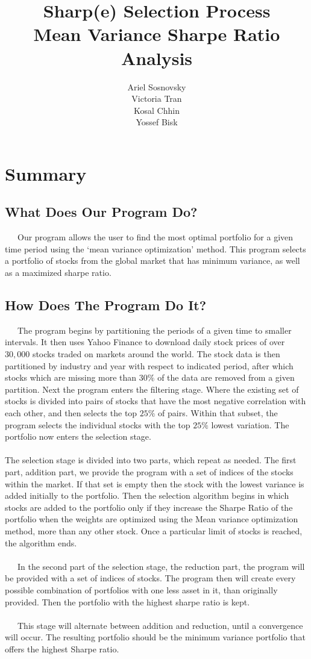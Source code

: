 \documentclass[12pt,titlepage,a4paper]{article}
\title{Sharp(e) Selection Process \\
	\large Mean Variance Sharpe Ratio Analysis}
\author{
	Ariel Sosnovsky\\
	Victoria Tran\\
	Kosal Chhin\\
	Yossef Bisk}
\begin{document}
\maketitle
\section{Summary}
\subsection{What Does Our Program Do?}
\ \ \ Our program allows the user to find the most optimal portfolio for a given time period using the ‘mean variance optimization’ method. This program selects a portfolio of stocks from the global market that has minimum variance, as well as a maximized sharpe ratio.

\subsection{How Does The Program Do It?}
\ \ \ The program begins by partitioning the periods of a given time to smaller intervals. It then uses Yahoo Finance to download daily stock prices of over $30,000$ stocks traded on markets around the world. The stock data is then partitioned by industry and year with respect to indicated period, after which stocks which are missing more than $30\%$ of the data are removed from a given partition. Next the program enters the filtering stage. Where the existing set of stocks is divided into pairs of stocks that have the most negative correlation with each other, and then selects the top $25\%$ of pairs. Within that subset, the program selects the individual stocks with the top $25\%$ lowest variation. The portfolio now enters the selection stage. \\ \\
The selection stage is divided into two parts, which repeat as needed. The first part, addition part, we provide the program with a set of indices of the stocks within the market. If that set is empty then the stock with the lowest variance is added initially to the portfolio. Then the selection algorithm begins in which stocks are added to the portfolio only if they increase the Sharpe Ratio of the portfolio when the weights are optimized using the Mean variance optimization method, more than any other stock. Once a particular limit of stocks is reached, the algorithm ends. \\ \\
\ \ \  In the second part of the selection stage, the reduction part, the program will be provided with a set of indices of stocks. The program then will create every possible combination of portfolios with one less asset in it, than originally provided. Then the portfolio with the highest sharpe ratio is kept.  \\ \\ 
\ \ \ This stage will alternate between addition and reduction, until a convergence will occur. The resulting portfolio should be the minimum variance portfolio that offers the highest Sharpe ratio. 
\end{document}
